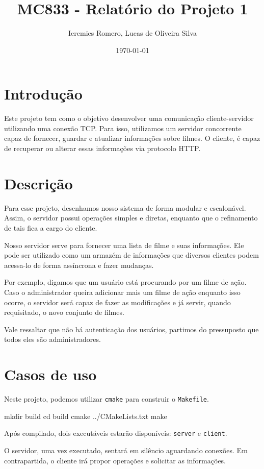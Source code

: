 \documentclass[11pt]{article}
\author{Ieremies Romero, Lucas de Oliveira Silva}
\date{\today}
\title{MC833 - Relatório do Projeto 1}
\theoremstyle{definition}
\theoremstyle{definition}
\theoremstyle{remark}
\theoremstyle{remark}
\theoremstyle{remark}
\theoremstyle{remark}
\theoremstyle{definition}
\begin{document}
\maketitle

\section*{Introdução}
\label{sec:orgf5d0dc7}
Este projeto tem como o objetivo desenvolver uma comunicação cliente-servidor utilizando uma conexão TCP. Para isso, utilizamos um servidor concorrente capaz de fornecer, guardar e atualizar informações sobre filmes. O cliente, é capaz de recuperar ou alterar essas informações via protocolo HTTP.

\section*{Descrição}
\label{sec:org3e61db7}
Para esse projeto, desenhamos nosso sistema de forma modular e escalonável. Assim, o servidor possui operações simples e diretas, enquanto que o refinamento de tais fica a cargo do cliente.

Nosso servidor serve para fornecer uma lista de filme e suas informações. Ele pode ser utilizado como um armazém de informações que diversos clientes podem acessa-lo de forma assíncrona e fazer mudanças.

Por exemplo, digamos que um usuário está procurando por um filme de ação. Caso o administrador queira adicionar mais um filme de ação enquanto isso ocorre, o servidor será capaz de fazer as modificações e já servir, quando requisitado, o novo conjunto de filmes.

Vale ressaltar que não há autenticação dos usuários, partimos do pressuposto que todos eles são administradores.
\section*{Casos de uso}
\label{sec:org72c421b}
Neste projeto, podemos utilizar \texttt{cmake} para construir o \texttt{Makefile}.

\begin{source}
mkdir build
cd build
cmake ../CMakeLists.txt
make
\end{source}

Após compilado, dois executáveis estarão disponíveis: \texttt{server} e \texttt{client}.

O servidor, uma vez executado, sentará em silêncio aguardando conexões. Em contrapartida, o cliente irá propor operações e solicitar as informações.
\end{document}
